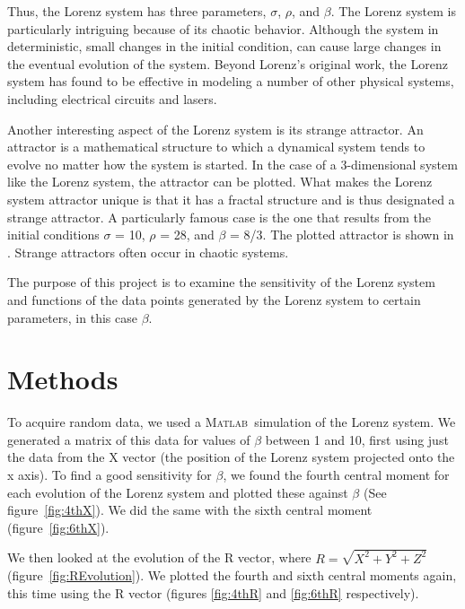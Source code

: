 \documentclass{article}[11pt]
\newcommand{\Matlab}{\textsc{Matlab}}
\begin{document}
Thus, the Lorenz system has three parameters, $\sigma$, $\rho$, and $\beta$.  The Lorenz system is particularly intriguing because of its chaotic behavior.  Although the system in deterministic, small changes in the initial condition, can cause large changes in the eventual evolution of the system.  Beyond Lorenz's original work, the Lorenz system has found to be effective in modeling a number of other physical systems, including electrical circuits and lasers.

Another interesting aspect of the Lorenz system is its strange attractor.  An attractor is a mathematical structure to which a dynamical system tends to evolve no matter how the system is started.  In the case of a 3-dimensional system like the Lorenz system, the attractor can be plotted.  What makes the Lorenz system attractor unique is that it has a fractal structure and is thus designated a strange attractor.  A particularly famous case is the one that results from the initial conditions $\sigma$ = 10, $\rho$ = 28, and $\beta$ = 8/3.  The plotted attractor is shown in .  Strange attractors often occur in chaotic systems.

The purpose of this project is to examine the sensitivity of the Lorenz system and functions of the data points generated by the Lorenz system to certain parameters, in this case $\beta$.
\section{Methods}
\label{sec:methods}

To acquire random data, we used a \Matlab \ simulation of the Lorenz system. We generated a matrix of this data for values of $\beta$ between 1 and 10, first using just the data from the X vector (the position of the Lorenz system projected onto the x axis). To find a good sensitivity for $\beta$, we found the fourth central moment for each evolution of the Lorenz system and plotted these against $\beta$ (See figure~\ref{fig:4thX}). We did the same with the sixth central moment (figure~\ref{fig:6thX}).

We then looked at the evolution of the R vector, where $R = \sqrt{X^2 + Y^2 + Z^2}$ (figure~\ref{fig:REvolution}). We plotted the fourth and sixth central moments again, this time using the R vector (figures \ref{fig:4thR} and \ref{fig:6thR} respectively).


\end{document}
